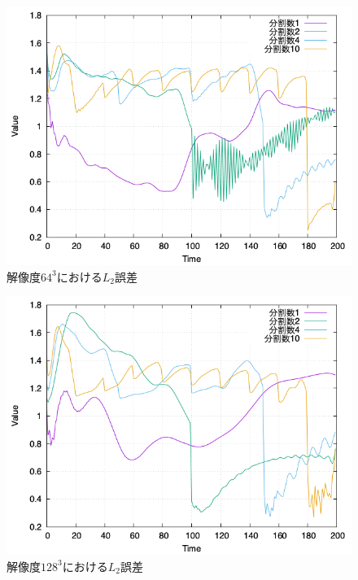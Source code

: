\documentclass[a4j,12pt]{jreport}
\begin{document}


\begin{figure}[htbp]
\centering
\includegraphics[width=140mm]{images/64error.png}
\caption{$解像度64^3におけるL_2誤差$}
\label{fig:64error}
\end{figure}

\begin{figure}[htbp]
\centering
\includegraphics[width=140mm]{images/128error.png}
\caption{$解像度128^3におけるL_2誤差$}
\label{fig:128error}
\end{figure}
\end{document}
